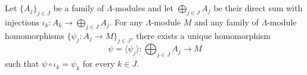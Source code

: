 Let $\{A_j\}_{j \in J}$ be a family of $\Lambda$-modules and let $\bigoplus_{j \in J} A_j$ be their direct sum with injections $\iota_k : A_k \to \bigoplus_{j \in J} A_j$. For any $\Lambda$-module $M$ and any family of $\Lambda$-module homomorphisms $\{\psi_j : A_j \to M\}_{j \in J}$, there exists a unique homomorphism
$$\psi = \langle \psi_j \rangle : \bigoplus_{j \in J} A_j \longrightarrow M$$
such that $\psi \circ \iota_k = \psi_k$ for every $k \in J$.